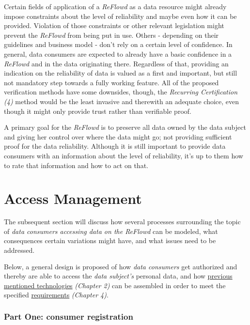\documentclass[12pt,english,a4paper,titlepage,cleardoublepage=empty,dottedtoc]{report}
\begin{document}
Certain fields of application of a \emph{ReFlowd} as a data resource
might already impose constraints about the level of reliability and
maybe even how it can be provided. Violation of those constraints or
other relevant legislation might prevent the \emph{ReFlowd} from being
put in use. Others - depending on their guidelines and business model -
don't rely on a certain level of confidence. In general, data consumers
are expected to already have a basic confidence in a \emph{ReFlowd} and
in the data originating there. Regardless of that, providing an
indication on the reliability of data is valued as a first and
important, but still not mandatory step towards a fully working feature.
All of the proposed verification methods have some downsides, though,
the \emph{Recurring Certification (4)} method would be the least
invasive and therewith an adequate choice, even though it might only
provide trust rather than verifiable proof.

A primary goal for the \emph{ReFlowd} is to preserve all data owned by
the data subject and giving her control over where the data might go;
not providing sufficient proof for the data reliability. Although it is
still important to provide data consumers with an information about the
level of reliability, it's up to them how to rate that information and
how to act on that.

\hypertarget{access-management}{\section{Access
Management}\label{access-management}}

The subsequent section will discuss how several processes surrounding
the topic of \emph{data consumers accessing data on the ReFlowd} can be
modeled, what consequences certain variations might have, and what
issues need to be addressed.

Below, a general design is proposed of how \emph{data consumers} get
authorized and thereby are able to access the \emph{data subject's}
personal data, and how
\protect\hyperlink{standards-specifications-and-related-technologies}{previous
mentioned technologies} \emph{(Chapter 2)} can be assembled in order to
meet the specified \protect\hyperlink{requirements}{requirements}
\emph{(Chapter 4)}.

\subsubsection*{Part One: consumer
registration}\label{part-one-consumer-registration}
\end{document}

